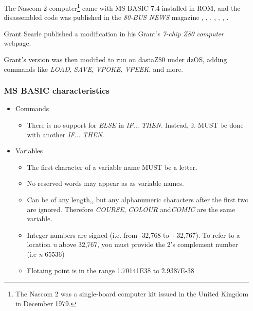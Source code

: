     The Nascom 2 computer\footnote{The Nascom 2 was a single-board computer kit
    issued in the United Kingdom in December 1979.} came with MS BASIC 7.4
    installed in ROM, and the disassembled code was published in the
    \textit{80-BUS NEWS} magazine \cite{80busnews23}, \cite{80busnews24},
    \cite{80busnews25}, \cite{80busnews26}, \cite{80busnews31},
    \cite{80busnews32}, \cite{80busnews33}.

    Grant Searle published a modification in his Grant's \textit{7-chip Z80
    computer} webpage\cite{searle2}.

    Grant's version was then modified to run on dastaZ80 under dzOS, adding
    commands like \textit{LOAD}, \textit{SAVE}, \textit{VPOKE}, \textit{VPEEK},
    and more.

        \subsubsection{MS BASIC characteristics}

        \begin{itemize}
            \item Commands
            \begin{itemize}
                \item There is no support for \textit{ELSE} in \textit{IF}...
                \textit{THEN}. Instead, it MUST be done with another \textit{IF}...
                \textit{THEN}.
            \end{itemize}
            \item Variables
            \begin{itemize}
                \item The first character of a variable name MUST be a letter.
                \item No reserved words may appear as as variable names.
                \item Can be of any length,, but any alphanumeric characters after
                the first two are ignored. Therefore \textit{COURSE},
                \textit{COLOUR} and\textit{COMIC} are the same variable.
                \item Integer numbers are signed (i.e. from -32,768 to +32,767). To
                refer to a location \textit{n} above 32,767, you must provide the
                2's complement number (i.e \textit{n}-65536)
                \item Flotaing point is in the range 1.70141E38 to 2.9387E-38
            \end{itemize}
        \end{itemize}

